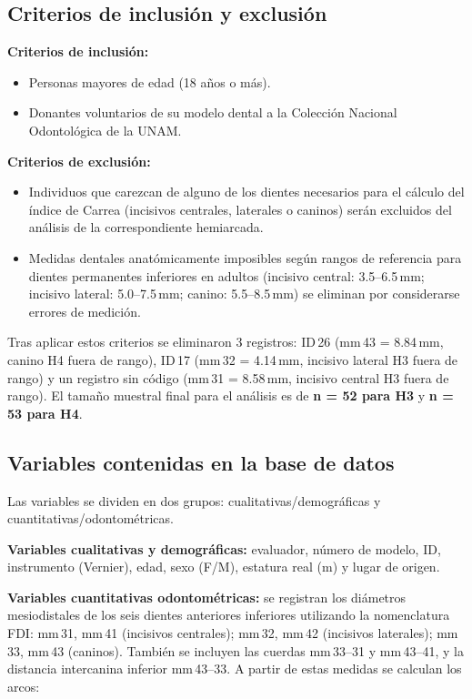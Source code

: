 \documentclass[11pt,letterpaper]{article}
\begin{document}
\subsection*{Criterios de inclusión y exclusión}

\textbf{Criterios de inclusión:}
\begin{itemize}
    \item Personas mayores de edad (18 años o más).
    \item Donantes voluntarios de su modelo dental a la Colección Nacional Odontológica de la UNAM.
\end{itemize}

\textbf{Criterios de exclusión:}
\begin{itemize}
    \item Individuos que carezcan de alguno de los dientes necesarios para el cálculo del índice de Carrea (incisivos centrales, laterales o caninos) serán excluidos del análisis de la correspondiente hemiarcada.
    \item Medidas dentales anatómicamente imposibles según rangos de referencia para dientes permanentes inferiores en adultos (incisivo central: 3.5--6.5\,mm; incisivo lateral: 5.0--7.5\,mm; canino: 5.5--8.5\,mm) se eliminan por considerarse errores de medición.
\end{itemize}

Tras aplicar estos criterios se eliminaron 3 registros: ID\,26 (mm\,43 = 8.84\,mm, canino H4 fuera de rango), ID\,17 (mm\,32 = 4.14\,mm, incisivo lateral H3 fuera de rango) y un registro sin código (mm\,31 = 8.58\,mm, incisivo central H3 fuera de rango). El tamaño muestral final para el análisis es de \textbf{n = 52 para H3} y \textbf{n = 53 para H4}.

\subsection*{Variables contenidas en la base de datos}

Las variables se dividen en dos grupos: cualitativas/demográficas y cuantitativas/odontométricas.

\textbf{Variables cualitativas y demográficas:} evaluador, número de modelo, ID, instrumento (Vernier), edad, sexo (F/M), estatura real (m) y lugar de origen.

\textbf{Variables cuantitativas odontométricas:} se registran los diámetros mesiodistales de los seis dientes anteriores inferiores utilizando la nomenclatura FDI: mm\,31, mm\,41 (incisivos centrales); mm\,32, mm\,42 (incisivos laterales); mm\,33, mm\,43 (caninos). También se incluyen las cuerdas mm\,33--31 y mm\,43--41, y la distancia intercanina inferior mm\,43--33. A partir de estas medidas se calculan los arcos:
\end{document}
